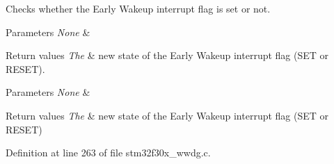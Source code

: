 Checks whether the Early Wakeup interrupt flag is set or not. 


\begin{DoxyParams}{Parameters}
{\em None} & \\
\hline
\end{DoxyParams}

\begin{DoxyRetVals}{Return values}
{\em The} & new state of the Early Wakeup interrupt flag (S\-E\-T or R\-E\-S\-E\-T).\\
\hline
\end{DoxyRetVals}

\begin{DoxyParams}{Parameters}
{\em None} & \\
\hline
\end{DoxyParams}

\begin{DoxyRetVals}{Return values}
{\em The} & new state of the Early Wakeup interrupt flag (S\-E\-T or R\-E\-S\-E\-T) \\
\hline
\end{DoxyRetVals}


Definition at line 263 of file stm32f30x\-\_\-wwdg.\-c.

